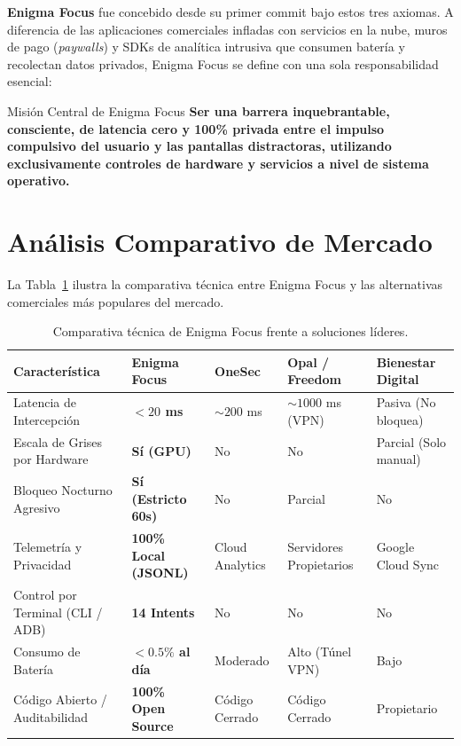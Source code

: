 \documentclass[11pt,a4paper,oneside]{report}
\begin{document}
\textbf{Enigma Focus} fue concebido desde su primer commit bajo estos tres axiomas. A diferencia de las aplicaciones comerciales infladas con servicios en la nube, muros de pago (\textit{paywalls}) y SDKs de analítica intrusiva que consumen batería y recolectan datos privados, Enigma Focus se define con una sola responsabilidad esencial:
\begin{calloutbox}{Misión Central de Enigma Focus}
    \textbf{Ser una barrera inquebrantable, consciente, de latencia cero y 100\% privada entre el impulso compulsivo del usuario y las pantallas distractoras, utilizando exclusivamente controles de hardware y servicios a nivel de sistema operativo.}
\end{calloutbox}

\section{Análisis Comparativo de Mercado}
La Tabla~\ref{tab:market_comparison} ilustra la comparativa técnica entre Enigma Focus y las alternativas comerciales más populares del mercado.

\begin{table}[h!]
\centering
\small
\begin{tabularx}{\textwidth}{>{\raggedright\arraybackslash}p{3.5cm} >{\centering\arraybackslash}X >{\centering\arraybackslash}X >{\centering\arraybackslash}X >{\centering\arraybackslash}X}
\toprule
\textbf{Característica} & \textbf{Enigma Focus} & \textbf{OneSec} & \textbf{Opal / Freedom} & \textbf{Bienestar Digital} \\
\midrule
Latencia de Intercepción & \textbf{$<20$ ms} & $\sim 200$ ms & $\sim 1000$ ms (VPN) & Pasiva (No bloquea) \\
Escala de Grises por Hardware & \textbf{Sí (GPU)} & No & No & Parcial (Solo manual) \\
Bloqueo Nocturno Agresivo & \textbf{Sí (Estricto 60s)} & No & Parcial & No \\
Telemetría y Privacidad & \textbf{100\% Local (JSONL)} & Cloud Analytics & Servidores Propietarios & Google Cloud Sync \\
Control por Terminal (CLI / ADB) & \textbf{14 Intents} & No & No & No \\
Consumo de Batería & \textbf{$< 0.5\%$ al día} & Moderado & Alto (Túnel VPN) & Bajo \\
Código Abierto / Auditabilidad & \textbf{100\% Open Source} & Código Cerrado & Código Cerrado & Propietario \\
\bottomrule
\end{tabularx}
\caption{Comparativa técnica de Enigma Focus frente a soluciones líderes.}
\label{tab:market_comparison}
\end{table}
\end{document}
